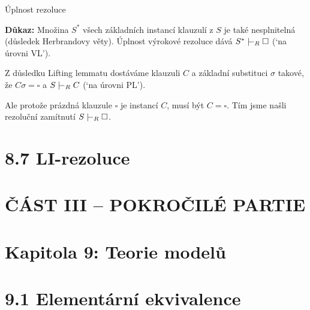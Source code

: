 \documentclass{beamer}
\begin{document}
\begin{frame}{Úplnost rezoluce}


    \medskip

    \textbf{Důkaz:}
    Množina $S^*$ všech základních instancí klauzulí z $S$ je také nesplnitelná (důsledek Herbrandovy věty). Úplnost \alert{výrokové} rezoluce dává $S^*\proves_R\square$ (`na úrovni VL'). 
    
    Z důsledku Lifting lemmatu dostáváme klauzuli $C$ a základní substituci $\sigma$ takové, že $C\sigma=\square$ a $S\proves_R C$ (`na úrovni PL'). 
    
    Ale protože prázdná klauzule $\square$ je instancí $C$, musí být $C=\square$. Tím jsme našli rezoluční zamítnutí $S\proves_R \square$.        
    \hfill\qedsymbol


    

\end{frame}



\section{8.7 LI-rezoluce}




\section{ČÁST III -- POKROČILÉ PARTIE}


\section{\sc Kapitola 9: Teorie modelů}


\section{9.1 Elementární ekvivalence}
\end{document}
